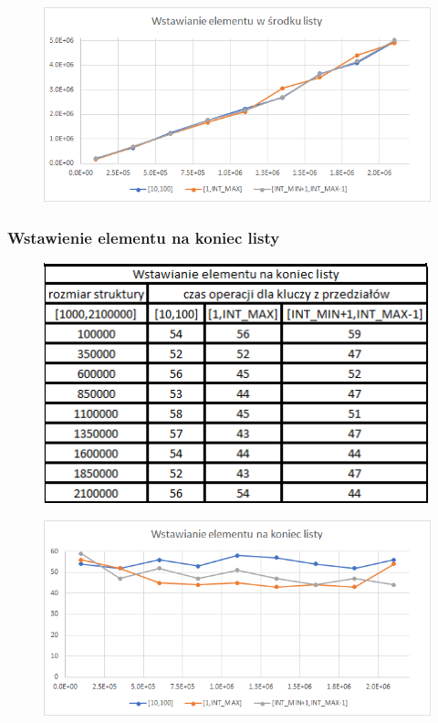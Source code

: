 \documentclass{article}
\begin{document}
\begin{figure}[h!]
\includegraphics[width=11.3cm]{images/list_wstawianie_srodek_w.png}
\end{figure}

\newpage

\subsubsection*{Wstawienie elementu na koniec listy}

\begin{figure}[h!]

\includegraphics{images/list_dod_koniec.png}

\end{figure}

\begin{figure}[h!]
\includegraphics[width=11.3cm]{images/list_dodaj_koniec_w.png}
\end{figure}
\end{document}
